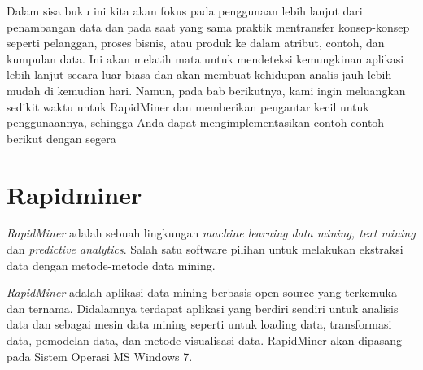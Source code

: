 \par  Dalam sisa buku ini kita akan fokus pada penggunaan lebih lanjut dari penambangan data dan pada saat yang sama praktik mentransfer konsep-konsep seperti pelanggan, proses bisnis, atau produk ke dalam atribut, contoh, dan kumpulan data. Ini akan melatih mata untuk mendeteksi kemungkinan aplikasi lebih lanjut secara luar biasa dan akan membuat kehidupan analis jauh lebih mudah di kemudian hari. Namun, pada bab berikutnya, kami ingin meluangkan sedikit waktu untuk RapidMiner dan memberikan pengantar kecil untuk penggunaannya, sehingga Anda dapat mengimplementasikan contoh-contoh berikut dengan segera

\section{Rapidminer}
\textit{RapidMiner} adalah sebuah lingkungan
\textit{machine learning data mining, text mining} dan \textit{predictive analytics}.\cite{vercellis2009business}
Salah satu software pilihan untuk melakukan ekstraksi data
dengan metode-metode data mining.\cite{cti2017implemetasi}
\par \textit{RapidMiner} adalah aplikasi data mining berbasis open-source yang terkemuka dan
ternama. Didalamnya terdapat aplikasi yang berdiri sendiri untuk analisis data dan sebagai
mesin data mining seperti untuk loading data, transformasi data, pemodelan data, dan metode
visualisasi data. RapidMiner akan dipasang pada Sistem Operasi MS Windows 7.\cite{yuda2014data}


